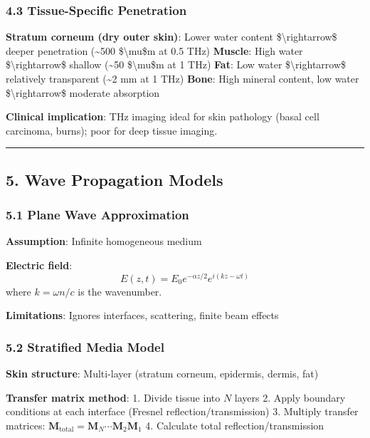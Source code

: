 \subsubsection{4.3 Tissue-Specific
Penetration}\label{tissue-specific-penetration}

\textbf{Stratum corneum (dry outer skin)}: Lower water content
\$\textbackslash rightarrow\$ deeper penetration (\textasciitilde500
\$\textbackslash mu\$m at 0.5 THz) \textbf{Muscle}: High water
\$\textbackslash rightarrow\$ shallow (\textasciitilde50
\$\textbackslash mu\$m at 1 THz) \textbf{Fat}: Low water
\$\textbackslash rightarrow\$ relatively transparent (\textasciitilde2
mm at 1 THz) \textbf{Bone}: High mineral content, low water
\$\textbackslash rightarrow\$ moderate absorption

\textbf{Clinical implication}: THz imaging ideal for skin pathology
(basal cell carcinoma, burns); poor for deep tissue imaging.

\begin{center}\rule{0.5\linewidth}{0.5pt}\end{center}

\subsection{5. Wave Propagation Models}\label{wave-propagation-models}

\subsubsection{5.1 Plane Wave
Approximation}\label{plane-wave-approximation}

\textbf{Assumption}: Infinite homogeneous medium

\textbf{Electric field}:
\[E(z,t) = E_0 e^{-\alpha z/2} e^{i(kz - \omega t)}\] where
\(k = \omega n/c\) is the wavenumber.

\textbf{Limitations}: Ignores interfaces, scattering, finite beam
effects

\subsubsection{5.2 Stratified Media Model}\label{stratified-media-model}

\textbf{Skin structure}: Multi-layer (stratum corneum, epidermis,
dermis, fat)

\textbf{Transfer matrix method}: 1. Divide tissue into \(N\) layers 2.
Apply boundary conditions at each interface (Fresnel
reflection/transmission) 3. Multiply transfer matrices:
\(\mathbf{M}_{\text{total}} = \mathbf{M}_N \cdots \mathbf{M}_2 \mathbf{M}_1\)
4. Calculate total reflection/transmission

